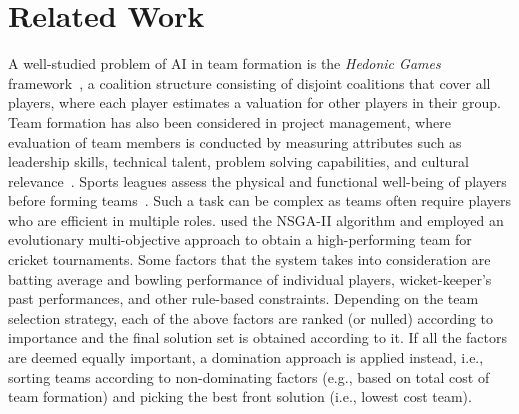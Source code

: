 \section{Related Work}
A well-studied problem of AI in team formation is the \textit{Hedonic Games} framework~\cite{aziz2017fractional, gairing2010computing}, %
a coalition structure consisting of disjoint coalitions that cover all players, where each player estimates a valuation for other players in their group. Team formation has also been considered in project management, where evaluation of team members is conducted by measuring attributes such as leadership skills, technical talent, problem solving capabilities, and cultural relevance~\cite{%
warhuus2021teaming}. Sports leagues assess the physical and functional well-being of players before forming teams~\cite{dadelo2014multi}. Such a task can be complex as %
teams often require players who are efficient in multiple roles. %
\cite{ahmed2013multi} used the NSGA-II algorithm and employed an evolutionary multi-objective approach to obtain a high-performing team for cricket tournaments. Some factors that the system takes into consideration are batting average and bowling performance of individual players, wicket-keeper's past performances, and other rule-based constraints. Depending on the team selection strategy, each of the above factors are ranked (or nulled) according to importance and the final solution set is obtained according to it. If all the factors are deemed equally important, a domination approach is applied instead, i.e., sorting teams according to non-dominating factors (e.g., based on total cost of team formation) and picking the best front solution (i.e., lowest cost team).

